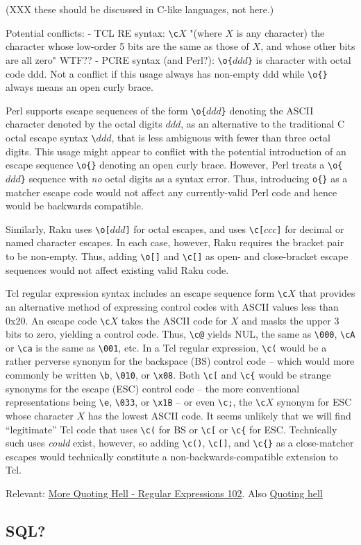 (XXX these should be discussed in C-like languages, not here.)

Potential conflicts:
- TCL RE syntax: \verb|\c|$X$ "(where $X$ is any character) the character whose low-order 5 bits are the same as those of $X$, and whose other bits are all zero"
WTF??
- PCRE syntax (and Perl?): \verb|\o{|$ddd$\verb|}| is character with octal code ddd.  Not a conflict if this usage always has non-empty ddd while \verb|\o{}| always means an open curly brace.

Perl supports escape sequences of the form \verb|\o{|$ddd$\verb|}|
denoting the ASCII character denoted by the octal digits $ddd$,
as an alternative to the traditional C octal escape syntax \verb|\|$ddd$,
that is less ambiguous with fewer than three octal digits.
This usage might appear to conflict with the potential introduction
of an escape sequence \verb|\o{}| denoting an open curly brace.
However, Perl treats a \verb|\o{|$ddd$\verb|}| sequence
with \emph{no} octal digits as a syntax error.
Thus, introducing \verb|o{}| as a matcher escape code
would not affect any currently-valid Perl code
and hence would be backwards compatible.

Similarly, Raku uses \verb|\o[|$ddd$\verb|]| for octal escapes,
and uses \verb|\c[|$ccc$\verb|]|
for decimal or named character escapes.
In each case, however, Raku requires the bracket pair to be non-empty.
Thus, adding \verb|\o[]| and \verb|\c[]|
as open- and close-bracket escape sequences
would not affect existing valid Raku code.

Tcl regular expression syntax includes an escape sequence form
\verb|\c|$X$ that provides an alternative method of expressing control codes
with ASCII values less than 0x20.
An escape code \verb|\c|$X$ takes the ASCII code for $X$
and masks the upper 3 bits to zero, yielding a control code.
Thus, \verb|\c@| yields NUL, the same as \verb|\000|,
\verb|\cA| or \verb|\ca| is the same as \verb|\001|, etc.
In a Tcl regular expression,
\verb|\c(| would be a rather perverse synonym for
the backspace (BS) control code --
which would more commonly be written \verb|\b|, \verb|\010|, or \verb|\x08|.
Both \verb|\c[| and \verb|\c{|
would be strange synonyms for the escape (ESC) control code --
the more conventional representations
being \verb|\e|, \verb|\033|, or \verb|\x1B| --
or even \verb|\c;|, the \verb|\c|$X$ synonym for ESC
whose character $X$ has the lowest ASCII code.
It seems unlikely that we will find ``legitimate'' Tcl code 
that uses \verb|\c(| for BS or \verb|\c[| or \verb|\c{| for ESC.
Technically such uses \emph{could} exist, however,
so adding \verb|\c()|, \verb|\c[]|, and \verb|\c{}| as a close-matcher escapes
would technically constitute a non-backwards-compatible extension to Tcl.

Relevant: \href{https://www.tcl.tk/man/tcl8.5/tutorial/Tcl21.html}{More Quoting Hell - Regular Expressions 102}.
Also \href{https://wiki.tcl-lang.org/page/Quoting+hell}{Quoting hell}

\subsection{SQL?}

